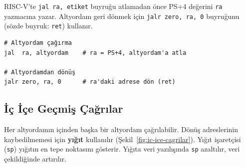 RISC-V'te \texttt{jal ra, etiket} buyruğu atlamadan önce PS+4 değerini \texttt{ra} yazmacına yazar. Altyordam geri dönmek için \texttt{jalr zero, ra, 0} buyruğunu (sözde buyruk: \texttt{ret}) kullanır.

\begin{lstlisting}[style=riscv]
# Altyordam çağırma
jal  ra, altyordam    # ra = PS+4, altyordam'a atla

# Altyordamdan dönüş
jalr zero, ra, 0      # ra'daki adrese dön (ret)
\end{lstlisting}

\subsection{İç İçe Geçmiş Çağrılar}

Her altyordamın içinden başka bir altyordam çağrılabilir. Dönüş adreslerinin kaybedilmemesi için \textbf{yığıt} kullanılır (Şekil~\ref{fig:ic-ice-cagrilar}). Yığıt işaretçisi (\texttt{sp}) yığıtın en tepe noktasını gösterir. Yığıta veri yazılışında \texttt{sp} azaltılır, veri çekildiğinde artırılır.

